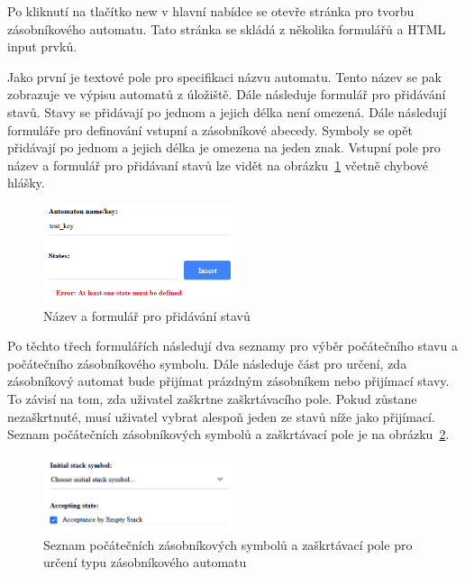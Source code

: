Po kliknutí na tlačítko new v hlavní nabídce se otevře stránka pro tvorbu zásobníkového automatu. Tato stránka se skládá z několika formulářů a HTML input prvků. 

Jako první je textové pole pro specifikaci názvu automatu. Tento název se pak zobrazuje ve výpisu automatů z úložiště. Dále následuje formulář pro přidávání stavů. Stavy se přidávají po jednom a jejich délka není omezená. Dále následují formuláře pro definování vstupní a zásobníkové abecedy. Symboly se opět přidávají po jednom a jejich délka je omezena na jeden znak. Vstupní pole pro název a formulář pro přidávaní stavů lze vidět na obrázku~\ref{fig:BuilderPart1} včetně chybové hlášky.

\begin{figure}[h]
    \centering
    \includegraphics[width=0.5\textwidth]{Figures/PrntScrn_UI_BuilderPart1.png}
    \caption{Název a formulář pro přidávání stavů}\label{fig:BuilderPart1}
\end{figure}

Po těchto třech formulářích následují dva seznamy pro výběr počátečního stavu a počátečního zásobníkového symbolu. Dále následuje část pro určení, zda zásobníkový automat bude přijímat prázdným zásobníkem nebo přijímací stavy. To závisí na tom, zda uživatel zaškrtne zaškrtávacího pole. Pokud zůstane nezaškrtnuté, musí uživatel vybrat alespoň jeden ze stavů níže jako přijímací. Seznam počátečních zásobníkových symbolů a zaškrtávací pole je na obrázku~\ref{fig:BuilderPart2}.

\begin{figure}[h]
    \centering
    \includegraphics[width=0.5\textwidth]{Figures/PrntScrn_UI_BuilderPart2.png}
    \caption{Seznam počátečních zásobníkových symbolů a zaškrtávací pole pro určení typu zásobníkového automatu}\label{fig:BuilderPart2}
\end{figure}

